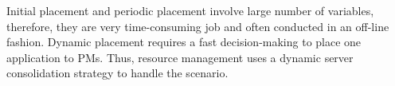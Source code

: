  Initial placement and periodic placement involve large number of variables, therefore, they are very time-consuming job and often conducted in an off-line fashion. Dynamic placement requires a fast decision-making to place one application to PMs. Thus, resource management uses a dynamic server consolidation strategy to handle the scenario. 












